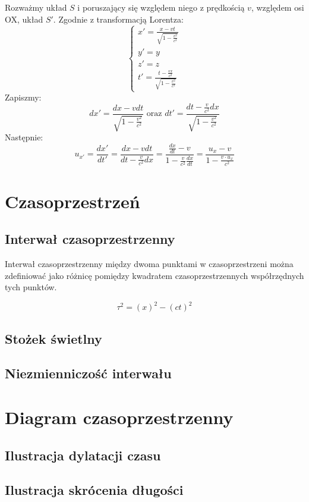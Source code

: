 \documentclass{article}
\theoremstyle{definition}
\theoremstyle{definition}
\theoremstyle{definition}
\theoremstyle{definition}
\begin{document}
Rozważmy układ \( S \) i poruszający się względem niego z prędkością $v$, względem osi OX, układ \( S' \).
Zgodnie z transformacją Lorentza:
\[
\begin{cases}
    x' = \frac{x-vt}{\sqrt{1-\frac{v^2}{c^2}}}\\
    y' = y\\
    z' = z\\
    t' = \frac{t-\frac{vx}{c^2}}{\sqrt{1-\frac{v^2}{c^2}}}
\end{cases}
\]
Zapiszmy:
\[ 
dx' = \frac{dx - vdt}{\sqrt{1-\frac{v^2}{c^2}}} \text{ oraz } dt' = \frac{dt-\frac{v}{c^2} dx}{\sqrt{1-\frac{v^2}{c^2}}}
\]
Następnie:
\[
u_{x'} = \frac{dx'}{dt'} = \frac{dx-vdt}{dt-\frac{v}{c^2} dx} = \frac{\frac{dx}{dt}-v}{1-\frac{v}{c^2}\frac{dx}{dt}}=\frac{u_x - v}{1-\frac{v\cdot u_x}{c^2}}
\]

\section{Czasoprzestrzeń}
\subsection{Interwał czasoprzestrzenny}

Interwał czasoprzestrzenny między dwoma punktami w czasoprzestrzeni można zdefiniować jako różnicę pomiędzy kwadratem czasoprzestrzennych współrzędnych tych punktów.

\[\tau^2 = (x)^2 - (ct)^2\]

\subsection{Stożek świetlny}
\subsection{Niezmienniczość interwału}

\section{Diagram czasoprzestrzenny}
\subsection{Ilustracja dylatacji czasu}
\subsection{Ilustracja skrócenia długości}
\end{document}
